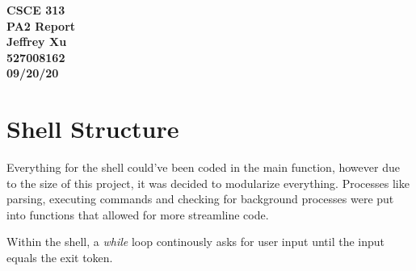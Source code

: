 \documentclass[12pt]{article}
\begin{document}
\begin{center}

{\bf
CSCE 313\\
PA2 Report\\
Jeffrey Xu\\
527008162\\
09/20/20\\
}

\end{center}

\section{Shell Structure}

Everything for the shell could've been coded in the main function, however due to the size of this project, it was decided to modularize everything. Processes like parsing, executing commands and checking for background processes were put into functions that allowed for more streamline code. 

Within the shell, a \emph{while} loop continously asks for user input until the input equals the exit token. 
\end{document}
